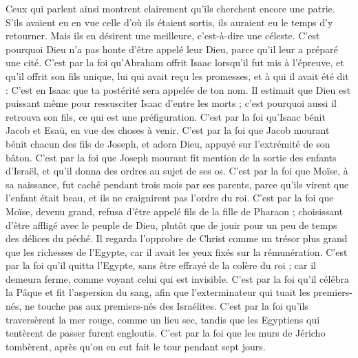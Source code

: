\begin{multicols}{2}
Ceux qui parlent ainsi montrent clairement qu'ils cherchent encore une patrie.
S’ils avaient eu en vue celle d’où ils étaient sortis, ils auraient eu le temps d’y retourner.
Mais ils en désirent une meilleure, c'est-à-dire une céleste. C’est pourquoi Dieu n’a pas honte d'être appelé leur Dieu, parce qu'il leur a préparé une cité.
C’est par la foi qu’Abraham offrit Isaac lorsqu’il fut mis à l’épreuve, et qu’il offrit son fils unique, lui qui avait reçu les promesses,
et à qui il avait été dit : C’est en Isaac que ta postérité sera appelée de ton nom.
Il estimait que Dieu est puissant même pour ressusciter Isaac d'entre les morts ; c'est pourquoi aussi il retrouva son fils, ce qui est une préfiguration.
\TextTitle{[Isaac]}
C’est par la foi qu’Isaac bénit Jacob et Esaü, en vue des choses à venir.
\TextTitle{[Jacob]}
C’est par la foi que Jacob mourant bénit chacun des fils de Joseph, et adora Dieu, appuyé sur l’extrémité de son bâton.
\TextTitle{[Joseph]}
C’est par la foi que Joseph mourant fit mention de la sortie des enfants d'Israël, et qu’il donna des ordres au sujet de ses os.
C’est par la foi que Moïse, à sa naissance, fut caché pendant trois mois par ses parents, parce qu’ils virent que l’enfant était beau, et ils ne craignirent pas l’ordre du roi.
\TextTitle{[Moïse]}
C’est par la foi que Moïse, devenu grand, refusa d'être appelé fils de la fille de Pharaon ;
choisissant d’être affligé avec le peuple de Dieu, plutôt que de jouir pour un peu de temps des délices du péché.
Il regarda l'opprobre de Christ comme un trésor plus grand que les richesses de l'Egypte, car il avait les yeux fixés sur la rémunération.
C’est par la foi qu’il quitta l'Egypte, sans être effrayé de la colère du roi ; car il demeura ferme, comme voyant celui qui est invisible.
C’est par la foi qu’il célébra la Pâque et fit l'aspersion du sang, afin que l’exterminateur qui tuait les premiers-nés, ne touche pas aux premiers-nés des Israélites.
C’est par la foi qu’ils traversèrent la mer rouge, comme un lieu sec, tandis que les Egyptiens qui tentèrent de passer furent engloutis.
C’est par la foi que les murs de Jéricho tombèrent, après qu'on en eut fait le tour pendant sept jours.
\TextTitle{[Rahab]}

\end{multicols}
